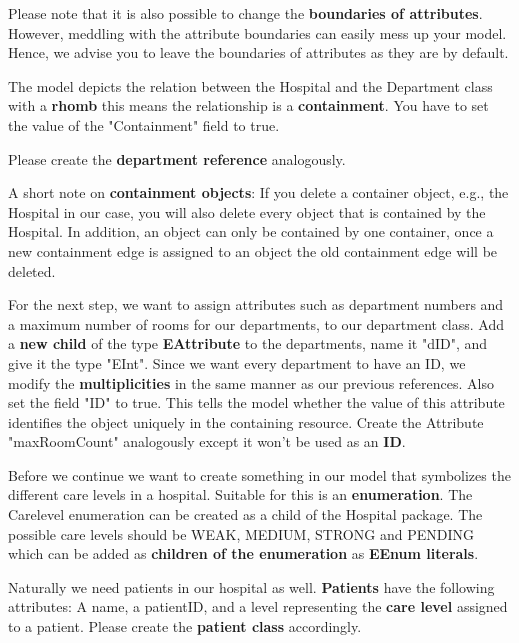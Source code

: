 Please note that it is also possible to change the \textbf{boundaries of attributes}. However, meddling with the attribute boundaries can easily mess up your model. Hence, we advise you to leave the boundaries of attributes as they are by default.\newline

The model depicts the relation between the Hospital and the Department class with a \textbf{rhomb} this means the relationship is a \textbf{containment}. You have to set the value of the \textsf{"Containment"} field to \textsf{true}.\newline

Please create the \textbf{department reference} analogously.\newline

A short note on \textbf{containment objects}: If you delete a container object, e.g., the Hospital in our case, you will also delete every object that is contained by the Hospital. In addition, an object can only be contained by one container, once a new containment edge is assigned to an object the old containment edge will be deleted.\newline

For the next step, we want to assign attributes such as department numbers and a maximum number of rooms for our departments, to our department class. Add a \textbf{new child} of the type \textbf{EAttribute} to the departments, name it \textsf{"dID"}, and give it the type \textsf{"EInt"}. Since we want every department to have an ID, we modify the \textbf{multiplicities} in the same manner as our previous references.
Also set the field \textsf{"ID"} to \textsf{true}. This tells the model whether the value of this attribute identifies the object uniquely in the containing resource.
\newline
Create the Attribute \textsf{"maxRoomCount"} analogously except it won't be used as an \textbf{ID}.\newline

Before we continue we want to create something in our model that symbolizes the different care levels in a hospital. Suitable for this is an \textbf{enumeration}. The \textsf{Carelevel} enumeration can be created as a child of the Hospital package. The possible care levels should be \textsf{WEAK}, \textsf{MEDIUM}, \textsf{STRONG} and \textsf{PENDING} which can be added as \textbf{children of the enumeration} as \textbf{EEnum literals}.\newline

Naturally we need patients in our hospital as well. \textbf{Patients} have the following attributes: A  \textsf{name}, a \textsf{patientID,} and a \textsf{level} representing the \textbf{care level} assigned to a patient.
Please create the \textbf{patient class} accordingly.\newline

